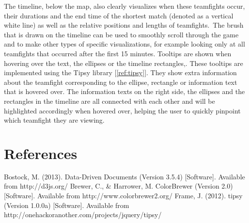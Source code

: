 \documentclass[11pt,twoside,a4paper]{article}
\begin{document}
The timeline, below the map, also clearly visualizes when these teamfights occur, their durations and the end time of the shortest match (denoted as a vertical white line) as well as the relative positions and lengths of teamfights.\ The brush that is drawn on the timeline can be used to smoothly scroll through the game and to make other types of specific visualizations, for example looking only at all teamfights that occurred after the first 15 minutes.\newline\newline
Tooltips are shown when hovering over the text, the ellipses or the timeline rectangles,. These tooltips are implemented using the Tipsy library [\ref{ref:tipsy}]. They show extra information about the teamfight corresponding to the ellipse, rectangle or information text that is hovered over. 
The information texts on the right side, the ellipses and the rectangles in the timeline are all connected with each other and will be highlighted accordingly when hovered over, helping the user to quickly pinpoint which teamfight they are viewing.

\newpage
{}

\section*{References}
Bostock, M. (2013). Data-Driven Documents (Version 3.5.4) [Software]. Available from http://d3js.org/ \label{ref:d3}
\newline
Brewer, C., \& Harrower, M. ColorBrewer (Version 2.0) [Software]. Available from http://www.colorbrewer2.org/ \label{ref:colorbrewer}
\newline
Frame, J. (2012). tipsy (Version 1.0.0a) [Software]. Available from http://onehackoranother.com/projects/jquery/tipsy/ \label{ref:tipsy}
\end{document}
